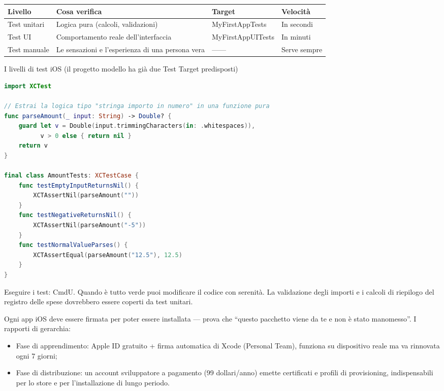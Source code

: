 \begin{center}
\begin{tabularx}{\linewidth}{|X|X|X|X|}
\hline
\textbf{Livello} & \textbf{Cosa verifica} & \textbf{Target} & \textbf{Velocità} \tabularnewline
\hline
Test unitari & Logica pura (calcoli, validazioni) & MyFirstAppTests & In secondi \tabularnewline
Test UI & Comportamento reale dell'interfaccia & MyFirstAppUITests & In minuti \tabularnewline
Test manuale & Le sensazioni e l'esperienza di una persona vera & —— & Serve sempre \tabularnewline
\hline
\end{tabularx}
\end{center}

\begin{center}\small\color{gray}I livelli di test iOS (il progetto modello ha già due Test Target predisposti)\end{center}

\begin{lstlisting}[language=Swift]
import XCTest

// Estrai la logica tipo "stringa importo in numero" in una funzione pura
func parseAmount(_ input: String) -> Double? {
    guard let v = Double(input.trimmingCharacters(in: .whitespaces)),
          v > 0 else { return nil }
    return v
}

final class AmountTests: XCTestCase {
    func testEmptyInputReturnsNil() {
        XCTAssertNil(parseAmount(""))
    }
    func testNegativeReturnsNil() {
        XCTAssertNil(parseAmount("-5"))
    }
    func testNormalValueParses() {
        XCTAssertEqual(parseAmount("12.5"), 12.5)
    }
}
\end{lstlisting}

Eseguire i test: CmdU. Quando è tutto verde puoi modificare il codice con serenità. La validazione degli importi e i calcoli di riepilogo del registro delle spese dovrebbero essere coperti da test unitari.


Ogni app iOS deve essere firmata per poter essere installata — prova che “questo pacchetto viene da te e non è stato manomesso”. I rapporti di gerarchia:

\begin{itemize}
  \item Fase di apprendimento: Apple ID gratuito + firma automatica di Xcode (Personal Team), funziona su dispositivo reale ma va rinnovata ogni 7 giorni;
  \item Fase di distribuzione: un account sviluppatore a pagamento (99 dollari/anno) emette certificati e profili di provisioning, indispensabili per lo store e per l'installazione di lungo periodo.
\end{itemize}

